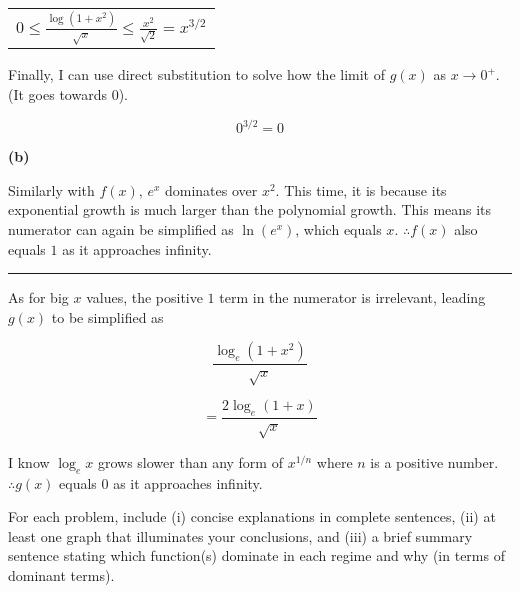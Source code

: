 \documentclass[answers,addpoints]{exam}
\begin{document}
\begin{questions}
\begin{solution}
\begin{center}
\begin{tabular}{@{}l@{}}
$ 0 \le \frac{\log(1+x^{2})}{\sqrt{x}} \leq \frac{x^{2}}{\sqrt{2}} = x^{3/2} $\\[6pt]
\end{tabular}
\end{center}

Finally, I can use direct substitution to solve how the limit of $g(x)$ as $x \to 0^{+}$. (It goes towards $0$).

\[
0^{3/2} = 0
\]

\textbf{(b)}

Similarly with $f(x)$, $e^{x}$ dominates over $x^{2}$. This time, it is because its exponential growth is much larger than the polynomial growth. This means its numerator can again be simplified as $\ln(e^{x})$, which equals $x$. $\therefore f(x)$ also equals $1$ as it approaches infinity.

\hrule

As for big $x$ values, the positive $1$ term in the numerator is irrelevant, leading $g(x)$ to be simplified as

\[
\frac{\log_{e}(1+x^{2})}{\sqrt{x}}
\]

\[
= \frac{2\log_{e}(1+x)}{\sqrt{x}}
\]

I know $\log_{e}{x}$ grows slower than any form of $x^{1/n}$ where $n$ is a positive number. $\therefore g(x)$ equals $0$ as it approaches infinity.

\end{solution}

\hrulefill


For each problem, include (i) concise explanations in complete sentences, (ii) at least one graph that illuminates your conclusions, and (iii) a brief summary sentence stating which function(s) dominate in each regime and why (in terms of dominant terms).

\end{questions}

\hrulefill
\end{document}
